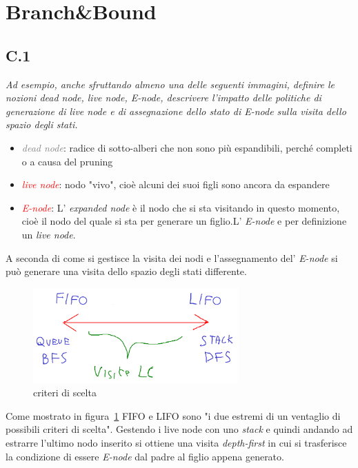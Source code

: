 \documentclass[a4paper]{article}
\begin{document}
\section{Branch\&Bound}
\subsection{C.1}
\label{SEC:C_1}
\emph{Ad esempio, anche sfruttando almeno una delle seguenti immagini, definire le nozioni dead node, live node, E-node, descrivere l'impatto delle politiche di generazione di live node e di assegnazione dello stato di E-node sulla visita dello spazio degli stati.}


\begin{itemize}
	\item \textcolor{gray}{\textit{dead node}}: radice di sotto-alberi che non sono più espandibili, perché completi o a causa del pruning
		\item \textcolor{red}{\textit{live node}}: nodo "vivo", cioè alcuni dei suoi figli sono ancora da espandere
		\item \textcolor{red}{\textit{E-node}}: L' \textit{expanded node} è il nodo che si sta visitando in questo momento, cioè il nodo del quale si sta per generare un figlio.L' \textit{E-node} e per definizione un \textit{live node}.
\end{itemize}
A seconda di come si gestisce la visita dei nodi e l'assegnamento del' \textit{E-node} si può generare una visita dello spazio degli stati differente.\\
\begin{figure}[!ht]
\centering
\includegraphics[width=0.7\textwidth]{./img/C_1.png}
\caption{criteri di scelta} \label{FIG:C_1}
\end{figure}
Come mostrato in figura~\ref{FIG:C_1} FIFO e LIFO sono "i due estremi di un ventaglio di possibili criteri di scelta".
Gestendo i live node con uno \emph{stack} e quindi andando ad estrarre l'ultimo nodo inserito si ottiene una visita \textit{depth-first} in cui si trasferisce la condizione di essere \textit{E-node} dal padre al figlio appena generato.
\end{document}
